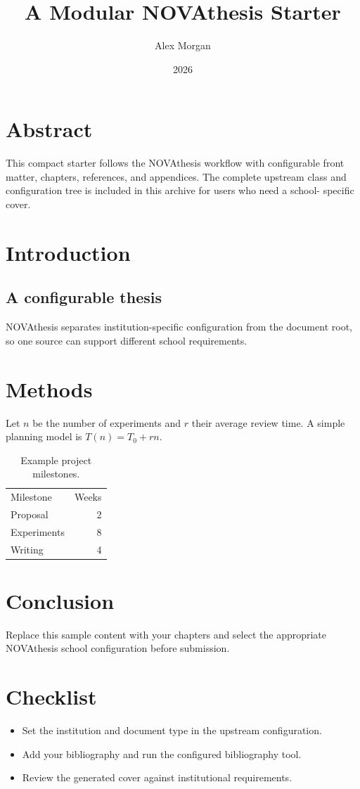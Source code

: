 \documentclass[11pt,oneside]{book}
\title{A Modular NOVAthesis Starter}
\author{Alex Morgan}
\date{2026}
\begin{document}
\frontmatter
\maketitle
\chapter*{Abstract}
This compact starter follows the NOVAthesis workflow with configurable front
matter, chapters, references, and appendices. The complete upstream class and
configuration tree is included in this archive for users who need a school-
specific cover.
\tableofcontents
\mainmatter
\chapter{Introduction}
\section{A configurable thesis}
NOVAthesis separates institution-specific configuration from the document root,
so one source can support different school requirements.
\chapter{Methods}
Let $n$ be the number of experiments and $r$ their average review time. A
simple planning model is $T(n)=T_0+rn$.
\begin{table}[ht]
  \centering
  \caption{Example project milestones.}
  \begin{tabular}{lr}
    Milestone & Weeks \\
    Proposal & 2 \\
    Experiments & 8 \\
    Writing & 4 \\
  \end{tabular}
\end{table}
\chapter{Conclusion}
Replace this sample content with your chapters and select the appropriate
NOVAthesis school configuration before submission.
\appendix
\chapter{Checklist}
\begin{itemize}
  \item Set the institution and document type in the upstream configuration.
  \item Add your bibliography and run the configured bibliography tool.
  \item Review the generated cover against institutional requirements.
\end{itemize}
\end{document}
